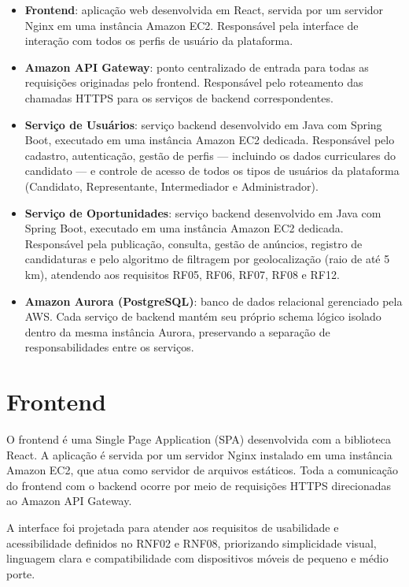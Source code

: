 \documentclass[
    12pt,
    oneside,
    a4paper,
    brazil
]{abntex2}
\begin{document}
\begin{itemize}
    \item \textbf{Frontend}: aplicação web desenvolvida em React, servida por um servidor Nginx em uma instância Amazon EC2. Responsável pela interface de interação com todos os perfis de usuário da plataforma.
    \item \textbf{Amazon API Gateway}: ponto centralizado de entrada para todas as requisições originadas pelo frontend. Responsável pelo roteamento das chamadas HTTPS para os serviços de backend correspondentes.
    \item \textbf{Serviço de Usuários}: serviço backend desenvolvido em Java com Spring Boot, executado em uma instância Amazon EC2 dedicada. Responsável pelo cadastro, autenticação, gestão de perfis — incluindo os dados curriculares do candidato — e controle de acesso de todos os tipos de usuários da plataforma (Candidato, Representante, Intermediador e Administrador).
    \item \textbf{Serviço de Oportunidades}: serviço backend desenvolvido em Java com Spring Boot, executado em uma instância Amazon EC2 dedicada. Responsável pela publicação, consulta, gestão de anúncios, registro de candidaturas e pelo algoritmo de filtragem por geolocalização (raio de até 5 km), atendendo aos requisitos RF05, RF06, RF07, RF08 e RF12.
    \item \textbf{Amazon Aurora (PostgreSQL)}: banco de dados relacional gerenciado pela AWS. Cada serviço de backend mantém seu próprio schema lógico isolado dentro da mesma instância Aurora, preservando a separação de responsabilidades entre os serviços.
\end{itemize}

\section{Frontend}

O frontend é uma Single Page Application (SPA) desenvolvida com a biblioteca React. A aplicação é servida por um servidor Nginx instalado em uma instância Amazon EC2, que atua como servidor de arquivos estáticos. Toda a comunicação do frontend com o backend ocorre por meio de requisições HTTPS direcionadas ao Amazon API Gateway.

A interface foi projetada para atender aos requisitos de usabilidade e acessibilidade definidos no RNF02 e RNF08, priorizando simplicidade visual, linguagem clara e compatibilidade com dispositivos móveis de pequeno e médio porte.
\end{document}
